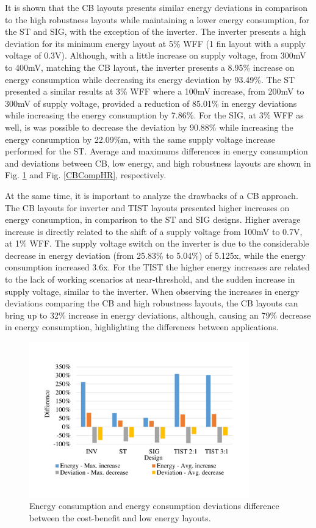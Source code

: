 \documentclass[pgmicro,diss,english]{iiufrgs}
\begin{document}
It is shown that the CB layouts presents similar energy deviations in comparison to the high robustness layouts while maintaining a lower energy consumption, for the ST and SIG, with the exception of the inverter. The inverter presents a high deviation for its minimum energy layout at 5\% WFF (1 fin layout with a supply voltage of 0.3V). Although, with a little increase on supply voltage, from 300mV to 400mV, matching the CB layout, the inverter presents a 8.95\% increase on energy consumption while decreasing its energy deviation by 93.49\%. The ST presented a similar results at 3\% WFF where a 100mV increase, from 200mV to 300mV of supply voltage, provided a reduction of 85.01\% in energy deviations while increasing the energy consumption by 7.86\%. For the SIG, at 3\% WFF as well, is was possible to decrease the deviation by 90.88\% while increasing the energy consumption by 22.09\%m, with the same supply voltage increase performed for the ST. Average and maximums differences in energy consumption and deviations between CB, low energy, and high robustness layouts are shown in Fig. \ref{CBCompLE} and Fig. \ref{CBCompHR}, respectively.

    At the same time, it is important to analyze the drawbacks of a CB approach. The CB layouts for inverter and TIST layouts presented higher increases on energy consumption, in comparison to the ST and SIG designs. Higher average increase is directly related to the shift of a supply voltage from 100mV to 0.7V, at 1\% WFF. The supply voltage switch on the inverter is due to the considerable decrease in energy deviation (from 25.83\% to 5.04\%) of 5.125x, while the energy consumption increased 3.6x. For the TIST the higher energy increases are related to the lack of working scenarios at near-threshold, and the sudden increase in supply voltage, similar to the inverter. When observing the increases in energy deviations comparing the CB and high robustness layouts, the CB layouts can bring up to 32\% increase in energy deviations, although, causing an 79\% decrease in energy consumption, highlighting the differences between applications.

\begin{figure}[t]
	\centering
       	\caption{Energy consumption and energy consumption deviations difference between the cost-benefit and low energy layouts. \label{CBCompLE}}        	  \includegraphics[width=0.85\textwidth, trim={1.25cm 2cm 2cm 3cm}, clip]{compCB-LE.pdf}
\end{figure}
\end{document}
